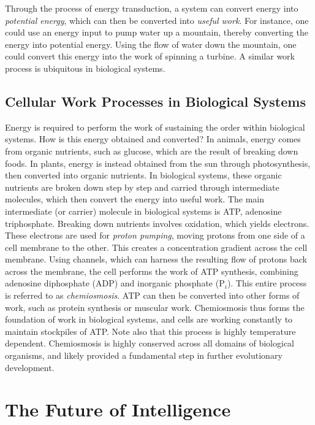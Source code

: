 Through the process of energy transduction, a system can convert energy into \textit{potential energy}, which can then be converted into \textit{useful work}. For instance, one could use an energy input to pump water up a mountain, thereby converting the energy into potential energy. Using the flow of water down the mountain, one could convert this energy into the work of spinning a turbine. A similar work process is ubiquitous in biological systems.

\subsection{Cellular Work Processes in Biological Systems}

Energy is required to perform the work of sustaining the order within biological systems. How is this energy obtained and converted? In animals, energy comes from organic nutrients, such as glucose, which are the result of breaking down foods. In plants, energy is instead obtained from the sun through photosynthesis, then converted into organic nutrients. In biological systems, these organic nutrients are broken down step by step and carried through intermediate molecules, which then convert the energy into useful work. The main intermediate (or carrier) molecule in biological systems is ATP, adenosine triphosphate. Breaking down nutrients involves oxidation, which yields electrons. These electrons are used for \textit{proton pumping}, moving protons from one side of a cell membrane to the other. This creates a concentration gradient across the cell membrane. Using channels, which can harness the resulting flow of protons back across the membrane, the cell performs the work of ATP synthesis, combining adenosine diphosphate (ADP) and inorganic phosphate (P$_i$). This entire process is referred to as \textit{chemiosmosis}. ATP can then be converted into other forms of work, such as protein synthesis or muscular work. Chemiosmosis thus forms the foundation of work in biological systems, and cells are working constantly to maintain stockpiles of ATP. Note also that this process is highly temperature dependent. Chemiosmosis is highly conserved across all domains of biological organisms, and likely provided a fundamental step in further evolutionary development.


\section{The Future of Intelligence}

